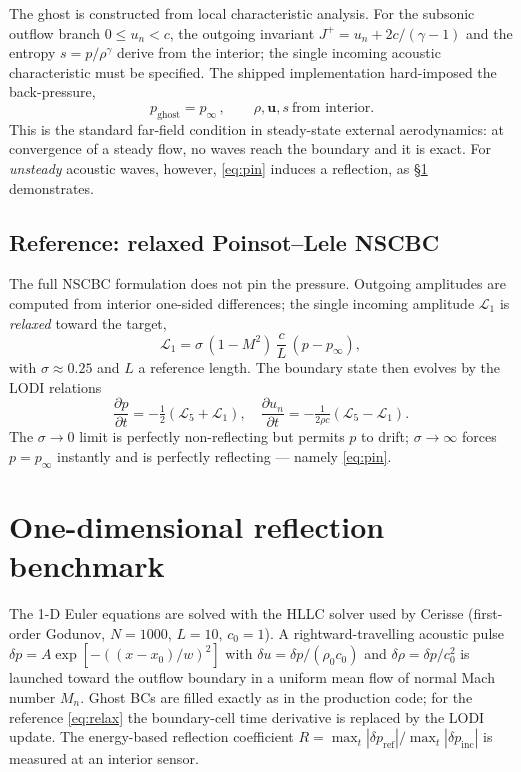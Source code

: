 \documentclass{jfm}
\newcommand{\pinf}{p_\infty}
\begin{document}
The ghost is constructed from local characteristic analysis. For the subsonic
outflow branch $0\le u_n<c$, the outgoing invariant $J^+=u_n+2c/(\gamma-1)$ and
the entropy $s=p/\rho^\gamma$ derive from the interior; the single incoming acoustic
characteristic must be specified. The shipped implementation hard-imposed the back-pressure,
\begin{equation}
\boxed{\,p_{\mathrm{ghost}}=\pinf\,},\qquad \rho,\bm u,s\ \text{from interior}.
\label{eq:pin}
\end{equation}
This is the standard far-field condition in steady-state external aerodynamics: at
convergence of a steady flow, no waves reach the boundary and it is exact. For
\emph{unsteady} acoustic waves, however, \eqref{eq:pin} induces a reflection, as
\S\ref{sec:1d} demonstrates.

\subsection{Reference: relaxed Poinsot--Lele NSCBC}

The full NSCBC formulation does not pin the pressure. Outgoing amplitudes are computed
from interior one-sided differences; the single incoming amplitude $\mathcal L_1$ is
\emph{relaxed} toward the target,
\begin{equation}
\mathcal L_1=\sigma\,(1-M^2)\,\frac{c}{L}\,(p-\pinf),
\label{eq:relax}
\end{equation}
with $\sigma\approx0.25$ and $L$ a reference length. The boundary state then evolves by
the LODI relations
\begin{equation}
\frac{\partial p}{\partial t}=-\tfrac12(\mathcal L_5+\mathcal L_1),\quad
\frac{\partial u_n}{\partial t}=-\tfrac1{2\rho c}(\mathcal L_5-\mathcal L_1).
\end{equation}
The $\sigma\!\to\!0$ limit is perfectly non-reflecting but permits $p$ to drift;
$\sigma\!\to\!\infty$ forces $p=\pinf$ instantly and is perfectly reflecting ---
namely \eqref{eq:pin}.

\section{One-dimensional reflection benchmark}\label{sec:1d}

The 1-D Euler equations are solved with the HLLC solver used by Cerisse (first-order
Godunov, $N=1000$, $L=10$, $c_0=1$). A rightward-travelling acoustic pulse
$\delta p=A\exp[-((x-x_0)/w)^2]$ with $\delta u=\delta p/(\rho_0c_0)$ and
$\delta\rho=\delta p/c_0^2$ is launched toward the outflow boundary in a uniform mean
flow of normal Mach number $M_n$. Ghost BCs are filled exactly as in the production
code; for the reference \eqref{eq:relax} the boundary-cell time derivative is replaced
by the LODI update. The energy-based reflection coefficient
$R=\max_t|\delta p_{\mathrm{ref}}|/\max_t|\delta p_{\mathrm{inc}}|$ is measured at an
interior sensor.
\end{document}
